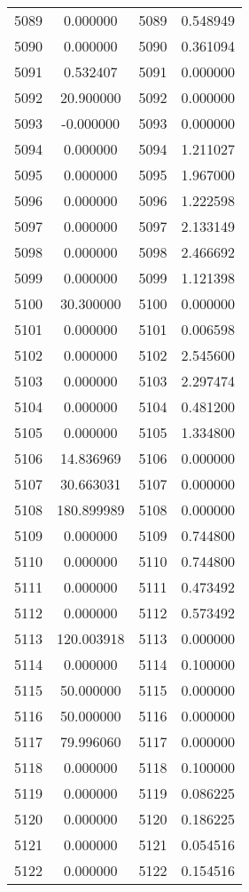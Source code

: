 \documentclass[12pt]{article}
\begin{document}
\begin{longtable}{@{}cccc@{}}
5089 & 0.000000 & 5089 & 0.548949 \\
5090 & 0.000000 & 5090 & 0.361094 \\
5091 & 0.532407 & 5091 & 0.000000 \\
5092 & 20.900000 & 5092 & 0.000000 \\
5093 & -0.000000 & 5093 & 0.000000 \\
5094 & 0.000000 & 5094 & 1.211027 \\
5095 & 0.000000 & 5095 & 1.967000 \\
5096 & 0.000000 & 5096 & 1.222598 \\
5097 & 0.000000 & 5097 & 2.133149 \\
5098 & 0.000000 & 5098 & 2.466692 \\
5099 & 0.000000 & 5099 & 1.121398 \\
5100 & 30.300000 & 5100 & 0.000000 \\
5101 & 0.000000 & 5101 & 0.006598 \\
5102 & 0.000000 & 5102 & 2.545600 \\
5103 & 0.000000 & 5103 & 2.297474 \\
5104 & 0.000000 & 5104 & 0.481200 \\
5105 & 0.000000 & 5105 & 1.334800 \\
5106 & 14.836969 & 5106 & 0.000000 \\
5107 & 30.663031 & 5107 & 0.000000 \\
5108 & 180.899989 & 5108 & 0.000000 \\
5109 & 0.000000 & 5109 & 0.744800 \\
5110 & 0.000000 & 5110 & 0.744800 \\
5111 & 0.000000 & 5111 & 0.473492 \\
5112 & 0.000000 & 5112 & 0.573492 \\
5113 & 120.003918 & 5113 & 0.000000 \\
5114 & 0.000000 & 5114 & 0.100000 \\
5115 & 50.000000 & 5115 & 0.000000 \\
5116 & 50.000000 & 5116 & 0.000000 \\
5117 & 79.996060 & 5117 & 0.000000 \\
5118 & 0.000000 & 5118 & 0.100000 \\
5119 & 0.000000 & 5119 & 0.086225 \\
5120 & 0.000000 & 5120 & 0.186225 \\
5121 & 0.000000 & 5121 & 0.054516 \\
5122 & 0.000000 & 5122 & 0.154516 \\

\end{longtable}
\end{document}
